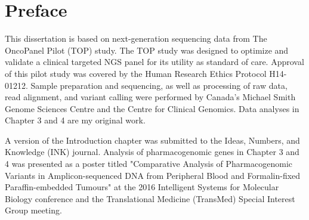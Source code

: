 
\chapter{Preface}

This dissertation is based on next-generation sequencing data from The OncoPanel Pilot (TOP) study. The TOP study was designed to optimize and validate a clinical targeted NGS panel for its utility as standard of care. Approval of this pilot study was covered by the Human Research Ethics Protocol H14-01212. Sample preparation and sequencing, as well as processing of raw data, read alignment, and variant calling were performed by Canada's Michael Smith Genome Sciences Centre and the Centre for Clinical Genomics. Data analyses in Chapter 3 and 4 are my original work.

A version of the Introduction chapter was submitted to the Ideas, Numbers, and Knowledge (INK) journal. Analysis of pharmacogenomic genes in Chapter 3 and 4 was presented as a poster titled "Comparative Analysis of Pharmacogenomic Variants in Amplicon-sequenced DNA from Peripheral Blood and Formalin-fixed Paraffin-embedded Tumours" at the 2016 Intelligent Systems for Molecular Biology conference and the Translational Medicine (TransMed) Special Interest Group meeting.
